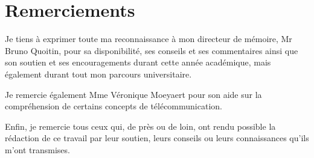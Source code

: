 \documentclass[12pt,a4paper,oneside, titlepage]{report}
\begin{document}
{}
\chapter*{Remerciements}
\renewcommand{\leftmark}{REMERCIEMENTS}

Je tiens à exprimer toute ma reconnaissance à mon directeur de mémoire, Mr Bruno Quoitin, pour sa disponibilité, ses conseils et ses commentaires ainsi que son soutien et ses encouragements durant cette année académique, mais également durant tout mon parcours universitaire.

\vspace{0.1cm}

Je remercie également Mme Véronique Moeyaert pour son aide sur la compré\-hension de certains concepts de télécommunication.

\vspace{0.1cm}

Enfin, je remercie tous ceux qui, de près ou de loin, ont rendu possible la rédaction de ce travail par leur soutien, leurs conseils ou leurs connaissances qu'ils m'ont transmises.

\newpage
\renewcommand{\leftmark}{TABLE DES MATI\`{E}RES}
\thispagestyle{fancy}
\tableofcontents



















\newpage
\appendix



\end{document}
